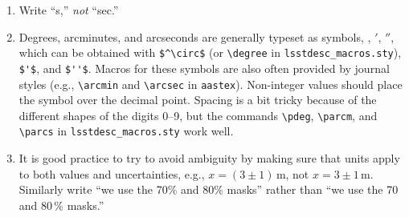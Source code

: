\documentclass[letterpaper,11pt]{article}
\begin{document}
\begin{enumerate}
\item Write ``s,'' {\it not\/} ``sec.''


\item Degrees, arcminutes, and arcseconds are generally typeset as symbols,
\degree, $'$, $''$, which can be obtained with \verb|$^\circ$| (or \verb|\degree| in {\tt lsstdesc\_macros.sty}), \verb|$'$|, and \verb|$''$|. Macros for these symbols are also often provided by journal styles (e.g., \verb|\arcmin| and \verb|\arcsec| in {\tt aastex}). Non-integer values should place the symbol over the
decimal point.  Spacing is a bit tricky because of the different shapes of the
digits 0--9, but the commands \verb|\pdeg|, \verb|\parcm|, and \verb|\parcs| in {\tt lsstdesc\_macros.sty}
work well.  



\item It is good practice to try to avoid ambiguity by making sure that units
apply to both values and uncertainties, e.g., $x=(3\pm1)\,$m, not $x=3\pm1\,$m.
 Similarly write ``we use the 70\% and 80\% masks'' rather than ``we use
the 70 and 80\,\% masks.''





\end{enumerate}
\end{document}

